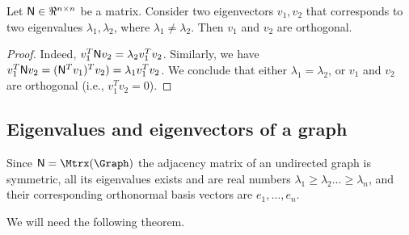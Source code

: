 \begin{lemma}
    Let $\mathsf{N} \in \Re^{n \times n}$ be a matrix.  Consider two
    eigenvectors $v_1, v_2$ that corresponds to two eigenvalues
    $\lambda_1, \lambda_2$, where $\lambda_1 \neq \lambda_2$. Then
    $v_1$ and $v_2$ are orthogonal.
\end{lemma}
\begin{proof}
    Indeed, $v_1^T \mathsf{N} v_2 = \lambda_2 v_1^T v_2$. Similarly, we have
    $v_1^T \mathsf{N} v_2 = (\mathsf{N}^T v_1)^T v_2) =\lambda_1 v_1^T v_2$. We
    conclude that either $\lambda_1 = \lambda_2$, or $v_1$ and $v_2$
    are orthogonal (i.e., $v_1^T v_2 = 0$).
\end{proof}


\subsection{Eigenvalues and eigenvectors of a graph}

Since $\MA = \Mtrx(\Graph)$ the adjacency matrix of an undirected
graph is symmetric, all its eigenvalues exists and are real numbers
$\lambda_1 \geq \lambda_2 \dots\geq \lambda_n$, and their
corresponding orthonormal basis vectors are $e_1,\ldots, e_n$.



We will
need the following theorem.


